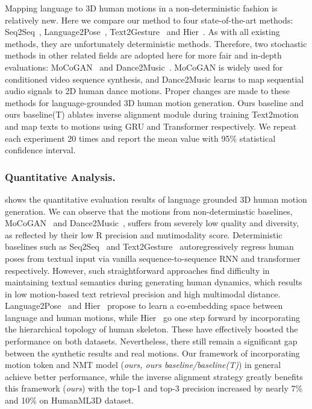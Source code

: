 \documentclass[runningheads]{llncs}
\newcommand{\beforesubsubsection}{\vspace{-5mm}}
\begin{document}
Mapping language to 3D human motions in a non-deterministic fashion is relatively new. Here we compare our method to four state-of-the-art methods: Seq2Seq~\cite{lin2018generating}, Language2Pose~\cite{ahuja2019language2pose}, Text2Gesture~\cite{bhattacharya2021text2gestures} and Hier~\cite{ghosh2021synthesis}. As with all existing methods, they are unfortunately deterministic methods. Therefore, two stochastic methods in other related fields are adopted here for more fair and in-depth evaluations: MoCoGAN~\cite{tulyakov2018mocogan} and Dance2Music~\cite{lee2019dancing}. MoCoGAN is widely used for conditioned video sequence synthesis, and Dance2Music learns to map sequential audio signals to 2D human dance motions. Proper changes are made to these methods for language-grounded 3D human motion generation. Ours baseline and ours baseline(T) ablates inverse alignment module during training Text2motion and map texts to motions using GRU and Transformer respectively. We repeat each experiment 20 times and report the mean value with 95\% statistical confidence interval.

\beforesubsubsection
\subsubsection{Quantitative Analysis.}  shows the quantitative evaluation results of language grounded 3D human motion generation. We can observe that the motions from non-determinstic baselines, MoCoGAN~\cite{tulyakov2018mocogan} and Dance2Music~\cite{lee2019dancing}, suffers from severely low quality and diversity, as reflected by their low R precision and mutimodality score. Deterministic baselines such as Seq2Seq~\cite{lin2018generating} and Text2Gesture~\cite{bhattacharya2021text2gestures} autoregressively regress human poses from textual input via vanilla sequence-to-sequence RNN and transformer respectively. However, such straightforward approaches find difficulty in maintaining textual semantics during generating human dynamics, which results in low motion-based text retrieval precision and high multimodal distance. Language2Pose~\cite{ahuja2019language2pose} and Hier~\cite{ghosh2021synthesis} propose to learn a co-embedding space between language and human motions, while Hier~\cite{ghosh2021synthesis} go one step forward by incorporating the hierarchical topology of human skeleton. These have effectively boosted the performance on both datasets. Nevertheless, there still remain a significant gap between the synthetic results and real motions. Our framework of incorporating motion token and NMT model (\textit{ours, ours baseline/baseline(T)}) in general achieve better performance, while the inverse alignment strategy greatly benefits this framework (\textit{ours}) with the top-1 and top-3 precision increased by nearly 7\% and 10\% on HumanML3D dataset.
\end{document}
